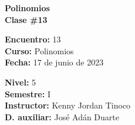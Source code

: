 \begin{center} \textbf
{
    \Large Polinomios \\ \vspace{2mm}Clase \#13
}
\end{center}

\begin{multicols}{2}
{
    \textbf{Encuentro:} 13\\
    \textbf{Curso:} Polinomios\\
    \textbf{Fecha:} 17 de junio de 2023\\
    \begin{flushright}
        \textbf{Nivel:} 5\\
        \textbf{Semestre:} I\\
        \textbf{Instructor:} Kenny Jordan Tinoco\\
        \textbf{D. auxiliar: }José Adán Duarte
    \end{flushright}
}
\end{multicols}

\thispagestyle{first-page-style}